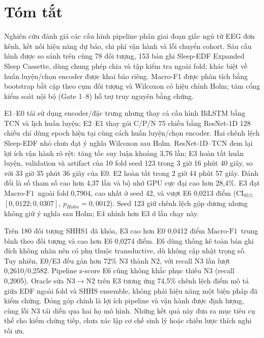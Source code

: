 \documentclass[11pt,a4paper]{article}
\newcommand{\mf}{\ensuremath{\mathrm{Macro\mbox{-}F1}}}
\newcommand{\ci}{\ensuremath{\mathrm{CI}_{95\%}}}
\begin{document}
\renewcommand{\contentsname}{Mục lục}
\renewcommand{\listtablename}{Danh mục bảng}
\renewcommand{\listfigurename}{Danh mục hình}
\renewcommand{\tablename}{Bảng}
\renewcommand{\figurename}{Hình}
\renewcommand{\refname}{Tài liệu tham khảo}
\hypersetup{pageanchor=false}


\hypersetup{pageanchor=true}
\tableofcontents
\newpage
\listoftables
\listoffigures
\newpage

\section*{Tóm tắt}
Nghiên cứu đánh giá các cấu hình pipeline phân giai đoạn giấc ngủ từ EEG đơn kênh, kết nối hiệu năng dự báo, chi phí vận hành và lỗi chuyển cohort. Sáu cấu hình được so sánh trên cùng 78 đối tượng, 153 bản ghi Sleep-EDF Expanded Sleep Cassette, dùng chung phép chia và tập kiểm tra ngoài fold; khác biệt về huấn luyện/chọn encoder được khai báo riêng. Macro-F1 được phân tích bằng bootstrap bắt cặp theo cụm đối tượng và Wilcoxon có hiệu chỉnh Holm; tám cổng kiểm soát nội bộ (Gate 1--8) hỗ trợ truy nguyên bằng chứng.

E1--E0 tái sử dụng encoder/đặc trưng nhưng thay cả cấu hình BiLSTM bằng TCN và lịch huấn luyện; E2--E1 thay gói C/P/N 75 chiều bằng ResNet-1D 128 chiều chỉ dùng epoch hiện tại cùng cách huấn luyện/chọn encoder. Hai chênh lệch Sleep-EDF nhỏ chưa đạt ý nghĩa Wilcoxon sau Holm. ResNet-1D--TCN đem lại lợi ích vận hành rõ rệt: tăng tốc suy luận khoảng 3,76 lần; E3 hoàn tất huấn luyện, validation và artifact của 10 fold seed 123 trong 3 giờ 16 phút 40 giây, so với 33 giờ 35 phút 36 giây của E0. E2 hoàn tất trong 2 giờ 44 phút 57 giây. Đánh đổi là số tham số cao hơn 4,37 lần và bộ nhớ GPU cực đại cao hơn 28,4\%. E3 đạt \mf\ ngoài fold 0,7904, cao nhất ở seed 42, và vượt E6 0,0213 điểm (\ci\ $[0,0122;0,0307]$, $p_{Holm}=0,0012$). Seed 123 giữ chênh lệch gộp dương nhưng không giữ ý nghĩa sau Holm; E4 nhỉnh hơn E3 ở lần chạy này.

Trên 180 đối tượng SHHS1 đã khóa, E3 cao hơn E0 0,0412 điểm \mf\ trung bình theo đối tượng và cao hơn E6 0,0274 điểm. E6 dùng thống kê toàn bản ghi đích không nhãn nên có phụ thuộc transductive, dù không cập nhật trọng số. Tuy nhiên, E0/E3 đều gán hơn 72\% N3 thành N2, với recall N3 lần lượt 0,2610/0,2582. Pipeline z-score E6 cũng không khắc phục thiếu N3 (recall 0,2005). Oracle sửa N3$\rightarrow$N2 trên E3 tương ứng 74,5\% chênh lệch điểm mô tả giữa EDF ngoài fold và SHHS ensemble, không phải hiệu năng một biện pháp đã kiểm chứng. Đóng góp chính là lợi ích pipeline và vận hành được định lượng, cùng lỗi N3 tái diễn qua hai họ mô hình. Những kết quả này đưa ra mục tiêu cụ thể cho kiểm chứng tiếp, chưa xác lập cơ chế sinh lý hoặc chiến lược thích nghi tối ưu.
\end{document}
